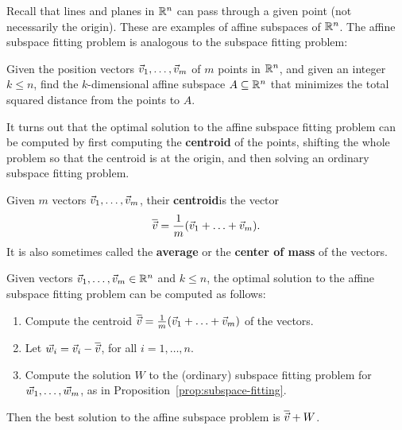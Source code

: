 \documentclass{ximera}
\begin{document}
Recall that lines and planes in $\mathbb{R}^n$ can pass through a given point (not
necessarily the origin). These are examples of affine subspaces of
$\mathbb{R}^n$. The affine subspace fitting problem is analogous to the
subspace fitting problem:

\begin{problem}\label{prob:affine-subspace-fitting}
  Given the position vectors $\vec{v}_1,\ldots,\vec{v}_m$ of $m$
  points in $\mathbb{R}^n$, and given an integer $k\leq n$, find the
  $k$-dimensional affine subspace $A\subseteq\mathbb{R}^n$ that minimizes the
  total squared distance from the points to $A$.
\end{problem}

It turns out that the optimal solution to the affine subspace fitting
problem can be computed by first computing the \textbf{centroid} of
the points, shifting the whole problem so that the centroid is at the
origin, and then solving an ordinary subspace fitting problem.

\begin{definition}\label{def:centroid}
  Given $m$ vectors $\vec{v}_1,\ldots,\vec{v}_m$, their
  \textbf{centroid}is the vector
  \begin{equation*}
    \overline{\vec{v}} = \frac{1}{m}(\vec{v}_1+\ldots+\vec{v}_m).
  \end{equation*}
  It is also sometimes called the \textbf{average} or the \textbf{center of mass} of the vectors.
\end{definition}

\begin{proposition}\label{prop:affine-subspace-fitting}
  Given vectors $\vec{v}_1,\ldots,\vec{v}_m\in\mathbb{R}^n$ and $k\leq n$,
  the optimal solution to the affine subspace fitting problem can be
  computed as follows:
  \begin{enumerate}
  \item Compute the centroid $\overline{\vec{v}} =
    \frac{1}{m}(\vec{v}_1+\ldots+\vec{v}_m)$ of the vectors.
  \item Let $\vec{w}_i = \vec{v}_i - \overline{\vec{v}}$, for all
    $i=1,\ldots,n$.
  \item Compute the solution $W$ to the (ordinary) subspace fitting
    problem for $\vec{w}_1,\ldots,\vec{w}_m$, as in
    Proposition~\ref{prop:subspace-fitting}.
  \end{enumerate}
  Then the best solution to the affine subspace problem is
  $\overline{\vec{v}} + W$.
\end{proposition}
\end{document}
